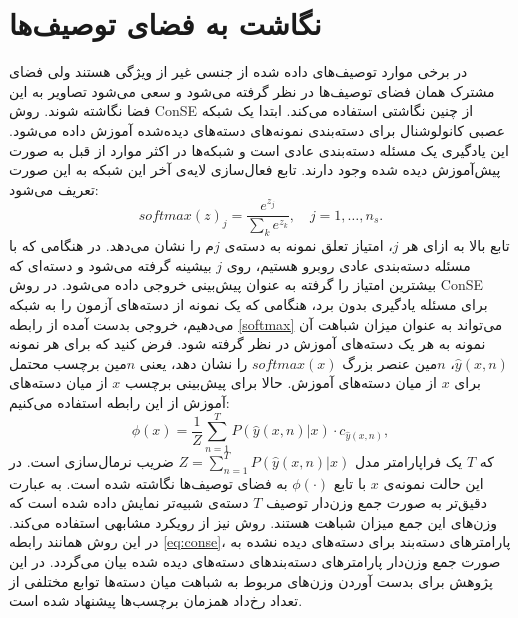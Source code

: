 \section{نگاشت به فضای توصیف‌ها}
در برخی موارد توصیف‌های داده شده از جنسی غیر از ویژگی هستند ولی فضای مشترک همان فضای توصیف‌ها در نظر گرفته می‌شود و سعی می‌شود تصاویر به این فضا نگاشته شوند.
روش ConSE
 \cite{convex} 
از چنین نگاشتی استفاده می‌کند.  ابتدا یک شبکه عصبی کانولوشنال برای دسته‌بندی نمونه‌های دسته‌های دیده‌شده آموزش داده می‌شود. این یادگیری یک مسئله دسته‌بندی عادی است و شبکه‌ها در اکثر موارد از قبل به صورت پیش‌آموزش دیده شده وجود دارند. تابع فعال‌سازی 
  لایه‌ی آخر این شبکه  به این صورت تعریف می‌شود:
 \begin{equation}
 \label{softmax}
 softmax(z)_j = \frac{e^{z_j}}{\sum_k e^{z_k}}, \quad j = 1, \ldots, n_s.
 \end{equation} 
 تابع بالا به ازای هر $j$، امتیاز تعلق نمونه به دسته‌ی $j$م را نشان می‌دهد. در هنگامی که با مسئله دسته‌بندی عادی روبرو هستیم، روی $j$ بیشینه گرفته می‌شود و دسته‌ای که بیشترین امتیاز را گرفته به عنوان پیش‌بینی خروجی داده می‌شود. در روش ConSE برای مسئله یادگیری بدون برد، هنگامی که یک نمونه از دسته‌های آزمون را به شبکه می‌دهیم، خروجی بدست آمده از رابطه \eqref{softmax} می‌تواند به عنوان میزان شباهت آن نمونه به هر یک دسته‌های آموزش در نظر گرفته شود. 
  فرض کنید که برای هر نمونه
 $\hat{y}(x,n)$،
 $n$مین 
 عنصر بزرگ $softmax(x)$ را نشان دهد، یعنی $n$مین برچسب محتمل برای $x$ از میان دسته‌های آموزش. حالا برای پیش‌بینی برچسب $x$ از میان دسته‌های آموزش از این رابطه استفاده می‌کنیم:
 \begin{equation}
 \label{eq:conse}
 \phi(x) = \frac{1}{Z} \sum_{n=1}^T P(\hat{y}(x,n) | x) \cdot c_{\hat{y}(x,n)},
 \end{equation}
 که $T$ یک فراپارامتر مدل
 $Z = \sum_{n=1}^T P(\hat{y}(x,n) | x) $
 ضریب نرمال‌سازی است. در این حالت نمونه‌ی $x$ با تابع $\phi(\cdot)$ به فضای توصیف‌ها نگاشته شده است. به عبارت دقیق‌تر به صورت جمع وزن‌دار توصیف $T$ دسته‌ی شبیه‌تر نمایش داده شده است که وزن‌های این جمع میزان شباهت هستند. 
 روش 
 \cite{costa}
 نیز از رویکرد مشابهی استفاده می‌کند. در این روش همانند رابطه \eqref{eq:conse}، پارامترهای دسته‌بند برای دسته‌های دیده نشده به صورت جمع وزن‌دار پارامترهای دسته‌بندهای دسته‌های دیده شده بیان می‌گردد. در این پژوهش برای بدست آوردن وزن‌های مربوط به شباهت میان دسته‌ها توابع مختلفی از تعداد رخ‌داد همزمان برچسب‌ها پیشنهاد شده است.




